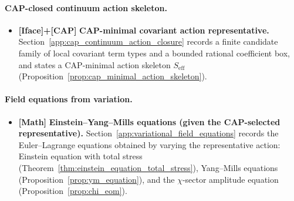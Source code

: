 \paragraph{CAP-closed continuum action skeleton.}
\begin{itemize}
\item \textbf{[Iface]+[CAP]} \textbf{CAP-minimal covariant action representative.}
Section~\ref{app:cap_continuum_action_closure} records a finite candidate family of local covariant term types and a bounded rational coefficient box, and states a CAP-minimal action skeleton $S_{\mathrm{eff}}$ (Proposition~\ref{prop:cap_minimal_action_skeleton}).
\end{itemize}

\paragraph{Field equations from variation.}
\begin{itemize}
\item \textbf{[Math]} \textbf{Einstein--Yang--Mills equations (given the CAP-selected representative).}
Section~\ref{app:variational_field_equations} records the Euler--Lagrange equations obtained by varying the representative action: Einstein equation with total stress (Theorem~\ref{thm:einstein_equation_total_stress}), Yang--Mills equations (Proposition~\ref{prop:ym_equation}), and the $\chi$-sector amplitude equation (Proposition~\ref{prop:chi_eom}).
\end{itemize}

